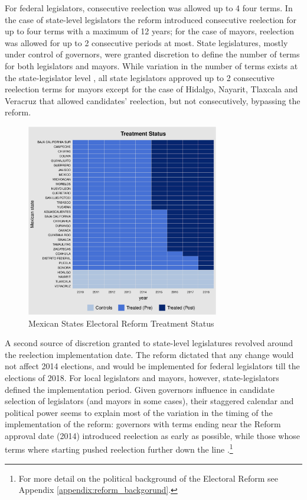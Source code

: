 \documentclass[12pt]{amsart}
\numberwithin{equation}{section}
\theoremstyle{definition}
\theoremstyle{definition}
\theoremstyle{definition}
\begin{document}
For federal legislators, consecutive reelection was allowed up to 4 four terms. In the case of state-level legislators the reform introduced consecutive reelection for up to four terms with a maximum of 12 years; for the case of mayors, reelection was allowed for up to 2 consecutive periods at most. State legislatures, mostly under control of governors, were granted discretion to define the number of terms for both legislators and mayors. While variation in the number of terms exists at the state-legislator level \citep{motolinia_2020}, all state legislators approved up to 2 consecutive reelection terms for mayors except for the case of Hidalgo, Nayarit, Tlaxcala and Veracruz that allowed candidates' reelection, but not consecutively, bypassing the reform.  

\begin{figure}[h]   
\centering 
\caption{Mexican States Electoral Reform Treatment Status}
\label{fig:treatment_status}
\includegraphics[width=0.75\textwidth]{Figures/reform_treatmentstatus.pdf}     
\captionsetup{justification=centering} 
\end{figure}   

 
A second source of discretion granted to state-level legislatures revolved around the reelection implementation date. The reform dictated that any change would not affect 2014 elections, and would be implemented for federal legislators till the elections of 2018. For local legislators and mayors, however, state-legislators defined the implementation period. Given governors influence in candidate selection of legislators (and mayors in some cases), their staggered calendar and political power seems to explain most of the variation in the timing of the implementation of the reform: governors with terms ending near the Reform approval date (2014) introduced reelection as early as possible, while those whose terms where starting pushed reelection further down the line \citep{motolinia_2020}.\footnote{For more detail on the political background of the Electoral Reform see Appendix \ref{appendix:reform_backgorund}.}
   
\end{document}
